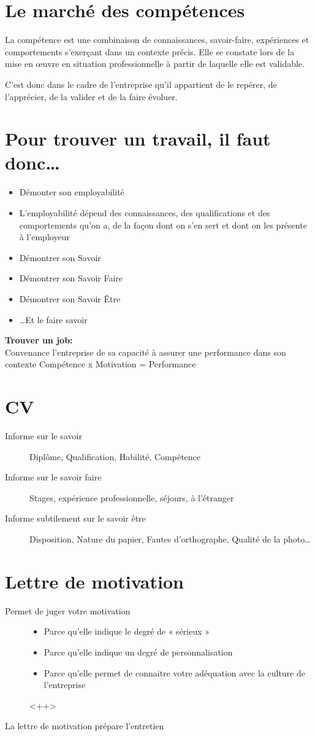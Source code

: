 \documentclass[12pt,a4paper,openany]{book}
\begin{document}
	\section{Le marché des compétences}
	La compétence est une combinaison de connaissances, savoir-faire, expériences et comportements s’exerçant dans un contexte précis. Elle se constate lors de
	la mise en œuvre en situation professionnelle à partir de laquelle elle est validable.

	C’est donc dans le cadre de l’entreprise qu’il appartient de le repérer, de l’apprécier, de la valider et de la faire évoluer.
	\section{Pour trouver un travail, il faut donc\ldots}
	\begin{itemize}
		\item Démonter son employabilité
		\item L’employabilité dépend des connaissances, des qualifications et des comportements qu’on a, de la façon dont on s’en sert et dont on les présente à
	l’employeur
	\item Démontrer son Savoir
	\item Démontrer son Savoir Faire
	\item Démontrer son Savoir Être
	\item \ldots Et le faire savoir
	\end{itemize}

	\textbf{Trouver un job:}\\
	Convenance l'entreprise de sa capacité à assurer une performance dans son contexte
	Compétence x Motivation = Performance
	\section{CV}
	\begin{description}
		\item[Informe sur le savoir] Diplôme, Qualification, Habilité, Compétence
		\item[ Informe sur le savoir faire ]  Stages, expérience professionnelle, séjours, à l’étranger
		\item[ Informe subtilement sur le savoir être ] Disposition, Nature du papier, Fautes d’orthographe, Qualité de la photo\ldots
	\end{description}
	\section{Lettre de motivation}
	\begin{description}
		\item[Permet de juger votre motivation]
			\begin{itemize}
				\item Parce qu’elle indique le degré de « sérieux »
				\item Parce qu’elle indique un degré de personnalisation
				\item Parce qu’elle permet de connaitre votre adéquation avec la culture de l’entreprise
			\end{itemize}<++>
		\item[La lettre de motivation prépare l’entretien]~
	\end{description}
\end{document}
